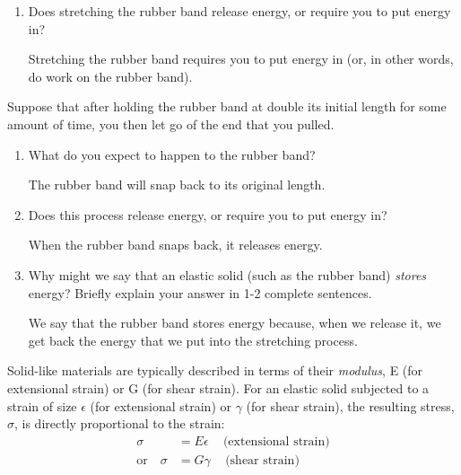 \begin{activity}
\begin{ctqs}
\begin{enumerate}
			\item Does stretching the rubber band release energy, or require you to put energy in?
			
				\begin{solution}[1.2in]
					Stretching the rubber band requires you to put energy in (or, in other words, do work on the rubber band).
				\end{solution}
			
		\end{enumerate}
		
	\question Suppose that after holding the rubber band at double its initial length for some amount of time, you then let go of the end that you pulled.
	
		\begin{enumerate}
			
			\item What do you expect to happen to the rubber band?
			
				\begin{solution}[1in]
					The rubber band will snap back to its original length.
				\end{solution}
			
			\item Does this process release energy, or require you to put energy in?
			
				\begin{solution}[1in]
					When the rubber band snaps back, it releases energy.
				\end{solution}
			
			\item Why might we say that an elastic solid (such as the rubber band) \emph{stores} energy?  Briefly explain your answer in 1-2 complete sentences.
			
				\begin{solution}[2in]
					We say that the rubber band stores energy because, when we release it, we get back the energy that we put into the stretching process.
				\end{solution}
			
		\end{enumerate}
	
\end{ctqs}

\begin{infobox}

	Solid-like materials are typically described in terms of their \emph{modulus}, E (for extensional strain) or G (for shear strain).  For an elastic solid subjected to a strain of size $\epsilon$ (for extensional strain) or $\gamma$ (for shear strain), the resulting stress, $\sigma$, is directly proportional to the strain:
	\begin{align*}
		\sigma &= E\epsilon\,\,\,\,\,\,\,\text{(extensional strain)}\\
		\text{or}\,\,\,\,\,\,\sigma &= G\gamma\,\,\,\,\,\,\,\text{(shear strain)}
	\end{align*}
	

\end{infobox}
\end{activity}

